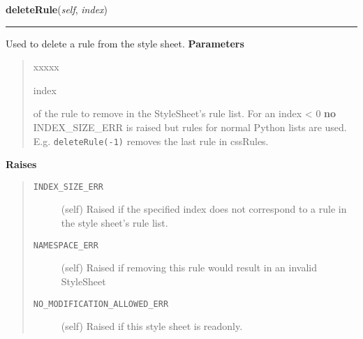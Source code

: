     \label{cssutils:css:cssstylesheet:CSSStyleSheet:deleteRule}

    \vspace{0.5ex}

\hspace{.8\funcindent}\begin{boxedminipage}{\funcwidth}

    \raggedright \textbf{deleteRule}(\textit{self}, \textit{index})

    \vspace{-1.5ex}

    \rule{\textwidth}{0.5\fboxrule}
\setlength{\parskip}{2ex}

Used to delete a rule from the style sheet.
\setlength{\parskip}{1ex}
      \textbf{Parameters}
      \vspace{-1ex}

      \begin{quote}
        \begin{Ventry}{xxxxx}

          \item[index]


of the rule to remove in the StyleSheet's rule list. For an
index {\textless} 0 \textbf{no} INDEX{\_}SIZE{\_}ERR is raised but rules for
normal Python lists are used. E.g. \texttt{deleteRule(-1)} removes
the last rule in cssRules.
        \end{Ventry}

      \end{quote}

      \textbf{Raises}
    \vspace{-1ex}

      \begin{quote}
        \begin{description}

          \item[\texttt{INDEX\_SIZE\_ERR}]


(self)
Raised if the specified index does not correspond to a rule in
the style sheet's rule list.
          \item[\texttt{NAMESPACE\_ERR}]


(self)
Raised if removing this rule would result in an invalid StyleSheet
          \item[\texttt{NO\_MODIFICATION\_ALLOWED\_ERR}]


(self)
Raised if this style sheet is readonly.
        \end{description}

      \end{quote}

    \end{boxedminipage}

